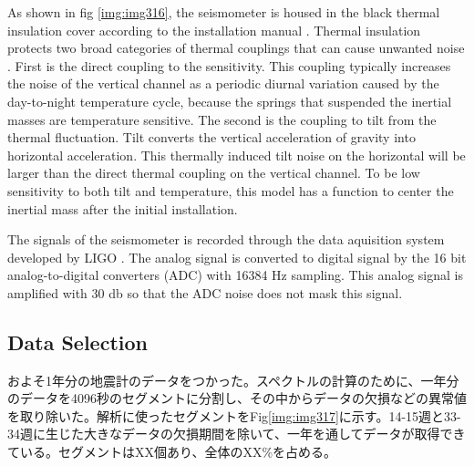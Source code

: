 As shown in fig \ref{img:img316}, the seismometer is housed in the black thermal insulation cover according to the installation manual \cite{trillium120manual}. Thermal insulation protects two broad categories of thermal couplings that can cause unwanted noise \cite{trillium120manual}. First is the direct coupling to the sensitivity. This coupling typically increases the noise of the vertical channel as a periodic diurnal variation caused by the day-to-night temperature cycle, because the springs that suspended the inertial masses are temperature sensitive. The second is the coupling to tilt from the thermal fluctuation. Tilt converts the vertical acceleration of gravity into horizontal acceleration. This thermally induced tilt noise on the horizontal will be larger than the direct thermal coupling on the vertical channel. To be low sensitivity to both tilt and temperature, this model has a function to center the inertial mass after the initial installation.

The signals of the seismometer is recorded through the data aquisition system developed by LIGO \cite{bork2001overview}. The analog signal is converted to digital signal by the 16 bit analog-to-digital converters (ADC) with 16384 $\mathrm{Hz}$ sampling. This analog signal is amplified with 30 db so that the ADC noise does not mask this signal. 



\subsection{Data Selection}
およそ1年分の地震計のデータをつかった。スペクトルの計算のために、一年分のデータを4096秒のセグメントに分割し、その中からデータの欠損などの異常値を取り除いた。解析に使ったセグメントをFig\ref{img:img317}に示す。14-15週と33-34週に生じた大きなデータの欠損期間を除いて、一年を通してデータが取得できている。セグメントはXX個あり、全体のXX\%を占める。


